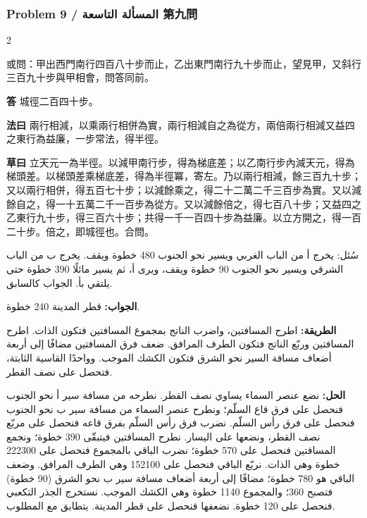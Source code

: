 \documentclass[11pt,a4paper]{article}
\newcommand{\ar}[1]{\arabicfont\beginR #1\endR}
\newcommand{\Answer}[1]{\par\noindent\textbf{\color{problemcolor}答} #1\par}
\newcommand{\Method}[1]{\par\noindent\textbf{\color{problemcolor}法曰} #1\par}
\newcommand{\Workings}[1]{\par\noindent\textbf{\color{problemcolor}草曰} #1\par}
\newcommand{\AnswerAr}{\par\noindent\textbf{\color{problemcolor}\ar{الجواب:}} }
\newcommand{\MethodAr}{\par\noindent\textbf{\color{problemcolor}\ar{الطريقة:}} }
\newcommand{\WorkingsAr}{\par\noindent\textbf{\color{problemcolor}\ar{الحل:}} }
\begin{document}
\vspace{0.5cm}

\subsubsection*{Problem 9 / \ar{المسألة التاسعة} \quad 第九問}

\begin{paracol}{2}

\noindent 或問：甲出西門南行四百八十步而止，乙出東門南行九十步而止，望見甲，又斜行三百九十步與甲相會，問答同前。

\vspace{0.2cm}

\Answer{城徑二百四十步。}

\vspace{0.2cm}

\Method{兩行相減，以乘兩行相併為實，兩行相減自之為從方，兩倍兩行相減又益四之東行為益廉，一步常法，得半徑。}

\vspace{0.2cm}

\Workings{立天元一為半徑。以減甲南行步，得為梯底差；以乙南行步內減天元，得為梯頭差。以梯頭差乘梯底差，得為半徑冪，寄左。乃以兩行相減，餘三百九十步；又以兩行相併，得五百七十步；以減餘乘之，得二十二萬二千三百步為實。又以減餘自之，得一十五萬二千一百步為從方。又以減餘倍之，得七百八十步；又益四之乙東行九十步，得三百六十步；共得一千一百四十步為益廉。以立方開之，得一百二十步。倍之，即城徑也。合問。}

\switchcolumn

\ar{سُئل: يخرج أ من الباب الغربي ويسير نحو الجنوب 480 خطوة ويقف. يخرج ب من الباب الشرقي ويسير نحو الجنوب 90 خطوة ويقف، ويرى أ، ثم يسير مائلًا 390 خطوة حتى يلتقي بأ. الجواب كالسابق.}

\vspace{0.2cm}

\AnswerAr{قطر المدينة 240 خطوة.}

\vspace{0.2cm}

\MethodAr{اطرح المسافتين، واضرب الناتج بمجموع المسافتين فتكون الذات. اطرح المسافتين وربّع الناتج فتكون الطرف المرافق. ضعف فرق المسافتين مضافًا إلى أربعة أضعاف مسافة السير نحو الشرق فتكون الكشك الموجب. وواحدًا القاسية الثابتة، فتحصل على نصف القطر.}

\vspace{0.2cm}

\WorkingsAr{نضع عنصر السماء يساوي نصف القطر. نطرحه من مسافة سير أ نحو الجنوب فنحصل على فرق قاع السلّم؛ ونطرح عنصر السماء من مسافة سير ب نحو الجنوب فنحصل على فرق رأس السلّم. نضرب فرق رأس السلّم بفرق قاعه فنحصل على مربّع نصف القطر، ونضعها على اليسار. نطرح المسافتين فيتبقّى 390 خطوة؛ ونجمع المسافتين فنحصل على 570 خطوة؛ نضرب الباقي بالمجموع فنحصل على 222300 خطوة وهي الذات. نربّع الباقي فنحصل على 152100 وهي الطرف المرافق. وضعف الباقي هو 780 خطوة؛ مضافًا إلى أربعة أضعاف مسافة سير ب نحو الشرق (90 خطوة) فتصبح 360؛ والمجموع 1140 خطوة وهي الكشك الموجب. نستخرج الجذر التكعبي فنحصل على 120 خطوة. نضعفها فنحصل على قطر المدينة. يتطابق مع المطلوب.}

\end{paracol}
\end{document}
